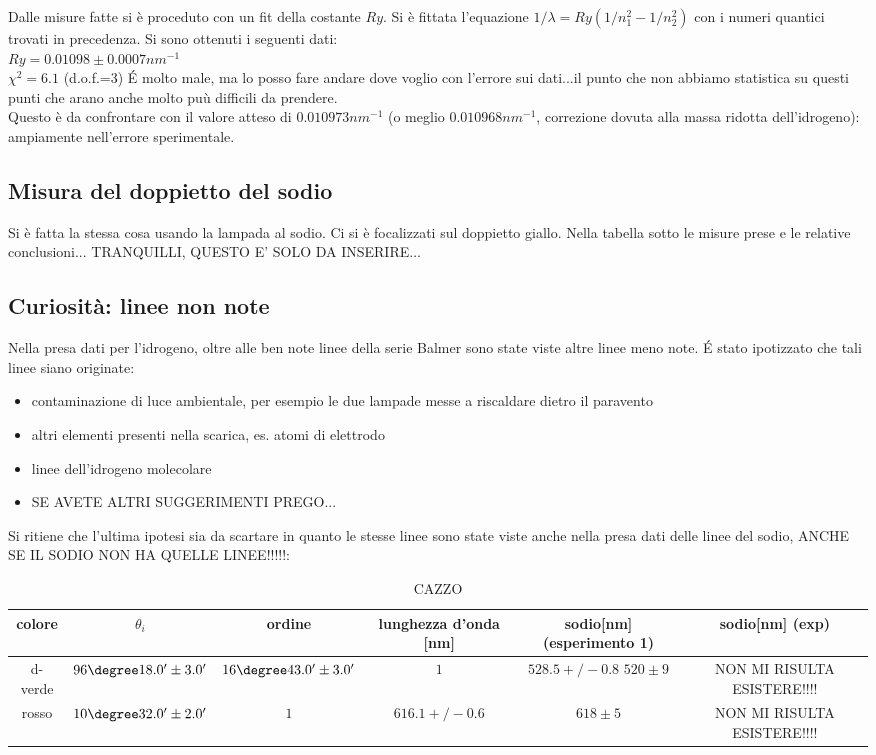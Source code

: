 \documentclass[a4paper,10pt]{article}
\begin{document}
{{{{{{{Dalle misure fatte si è proceduto con un fit della costante $Ry$. Si è fittata l'equazione $1/\lambda=Ry(1/n_1^2-1/n_2^2)$ con i numeri quantici trovati in precedenza. Si sono ottenuti i seguenti dati:\\
$Ry= 0.01098 \pm 0.0007 nm^{-1}$ \\
$\chi^2=6.1$ (d.o.f.=3) \'E molto male, ma lo posso fare andare dove voglio con l'errore sui dati...il punto che non abbiamo statistica su questi punti che arano anche molto puù difficili da prendere.\\ 

Questo è da confrontare con il valore atteso di $0.010973 nm^{-1}$ (o meglio $0.010968 nm^{-1}$, correzione dovuta alla massa ridotta dell'idrogeno): ampiamente nell'errore sperimentale.
 

\subsection{Misura del doppietto del sodio}
Si è fatta la stessa cosa usando la lampada al sodio. Ci si è focalizzati sul doppietto giallo. Nella tabella sotto le misure prese e le relative conclusioni...
TRANQUILLI, QUESTO E' SOLO DA INSERIRE...




\subsection{Curiosità: linee non note}
Nella presa dati per l'idrogeno, oltre alle ben note linee della serie Balmer sono state viste altre linee meno note. \'E stato ipotizzato che tali linee siano originate:
\begin{itemize}
\item contaminazione di luce ambientale, per esempio le due lampade messe a riscaldare dietro il paravento
\item altri elementi presenti nella scarica, es. atomi di elettrodo
\item linee dell'idrogeno molecolare
\item SE AVETE ALTRI SUGGERIMENTI PREGO...
\end{itemize}
Si ritiene che l'ultima ipotesi sia da scartare in quanto le stesse linee sono state viste anche nella presa dati delle linee del sodio, ANCHE SE IL SODIO NON HA QUELLE LINEE!!!!!:\\


\begin{table}[H]
\centering
\begin{tabular}{c|c|c|c|c|c}
colore & $\theta_i$ & ordine & lunghezza d'onda [nm] & sodio[nm](esperimento 1) & sodio[nm] (exp)  \\
\hline
d-verde &  $ 96\degree 18.0' \pm 3.0 ' $  &  $ 16\degree 43.0' \pm 3.0 ' $  &  $ 1 $ & $ 528.5+/-0.8 $ $520 \pm 9$&NON MI RISULTA ESISTERE!!!! \\
rosso &    $ 10\degree 32.0' \pm 2.0 ' $  &  $ 1 $ & $ 616.1+/-0.6 $ & $ 618 \pm 5 $& NON MI RISULTA ESISTERE!!!!\\
\end{tabular}
\caption{CAZZO}
\label{tab:HNa}
\end{table}



}}}}}}}
\end{document}
